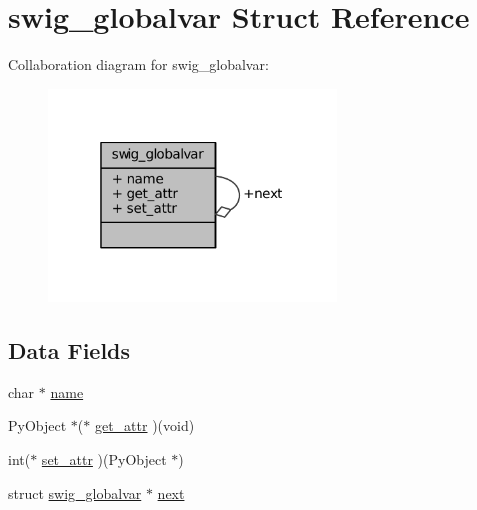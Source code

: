\hypertarget{structswig__globalvar}{\section{swig\-\_\-globalvar Struct Reference}
\label{structswig__globalvar}
}


Collaboration diagram for swig\-\_\-globalvar\-:
\nopagebreak
\begin{figure}[H]
\begin{center}
\leavevmode
\includegraphics[width=217pt]{structswig__globalvar__coll__graph}
\end{center}
\end{figure}
\subsection*{Data Fields}
\begin{DoxyCompactItemize}
\item 
char $\ast$ \hyperlink{structswig__globalvar_a5ac083a645d964373f022d03df4849c8}{name}
\item 
Py\-Object $\ast$($\ast$ \hyperlink{structswig__globalvar_a0879d4d584d1ffda2ef5f917dc5a6f0a}{get\-\_\-attr} )(void)
\item 
int($\ast$ \hyperlink{structswig__globalvar_aa452f906a54c91621799831e4280478f}{set\-\_\-attr} )(Py\-Object $\ast$)
\item 
struct \hyperlink{structswig__globalvar}{swig\-\_\-globalvar} $\ast$ \hyperlink{structswig__globalvar_acaa8d5ee0bdeaf2c6975b8751dc580fa}{next}
\end{DoxyCompactItemize}


